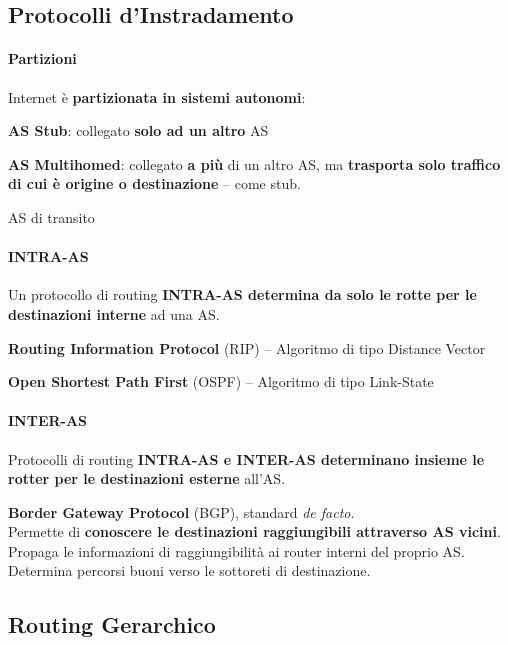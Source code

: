 \documentclass[10pt]{article}
\begin{document}
\subsection{Protocolli d'Instradamento}
\paragraph{Partizioni} Internet è \textbf{partizionata in sistemi autonomi}:
\begin{list}{}{}
	\item \textbf{AS Stub}: collegato \textbf{solo ad un altro} AS
	\item \textbf{AS Multihomed}: collegato \textbf{a più} di un altro AS, ma \textbf{trasporta solo traffico di cui è origine o destinazione} -- come stub.
	\item AS di transito
\end{list}
\paragraph{INTRA-AS} Un protocollo di routing \textbf{INTRA-AS determina da solo le rotte per le destinazioni interne} ad una AS.
\begin{list}{}{}
	\item \textbf{Routing Information Protocol} (RIP) -- Algoritmo di tipo Distance Vector
	\item \textbf{Open Shortest Path First} (OSPF) -- Algoritmo di tipo Link-State
\end{list}
\paragraph{INTER-AS} Protocolli di routing \textbf{INTRA-AS e INTER-AS determinano insieme le rotter per le destinazioni esterne} all'AS.
\begin{list}{}{}
	\item \textbf{Border Gateway Protocol} (BGP), standard \textit{de facto}.\\
	Permette di \textbf{conoscere le destinazioni raggiungibili attraverso AS vicini}.\\Propaga le informazioni di raggiungibilità ai router interni del proprio AS.\\Determina percorsi buoni verso le sottoreti di destinazione.
\end{list}
\pagebreak
\subsection{Routing Gerarchico}
\end{document}
